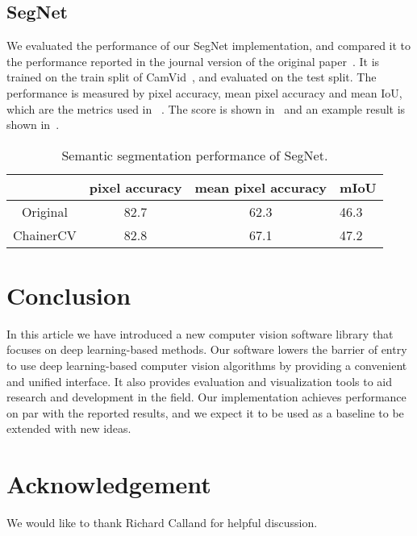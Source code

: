 \documentclass[sigconf]{acmart}
\begin{document}
\subsection{SegNet}
We evaluated the performance of our SegNet implementation, and compared it to the performance reported in the journal version of the original paper~\cite{badrinarayanan2015segnet}. It is trained on the train split of CamVid~\cite{badrinarayanan2015segnet}, and evaluated on the test split.
The performance is measured by pixel accuracy, mean pixel accuracy and mean IoU, which are the metrics used in ~\cite{badrinarayanan2015segnet}.
The score is shown in~ and an example result is shown in~.
\begin{table}[t]
\caption{Semantic segmentation performance of SegNet.}
  \label{table:semantic}
  \begin{tabular}{cccl}
    \toprule
    & pixel accuracy &mean pixel accuracy& mIoU \\
    \midrule
    Original \cite{badrinarayanan2015segnet} & 82.7 & 62.3 & 46.3 \\
    ChainerCV & 82.8 & 67.1 & 47.2 \\
  \bottomrule
\end{tabular}
\end{table}

\section{Conclusion}
In this article we have introduced a new computer vision software library that focuses on deep learning-based methods.
Our software lowers the barrier of entry to use deep learning-based computer vision algorithms by providing a convenient and unified interface.
It also provides evaluation and visualization tools to aid research and development in the field.
Our implementation achieves performance on par with the reported results, and we expect it to be used as a baseline to be extended with new ideas.

\section*{Acknowledgement}
We would like to thank Richard Calland for helpful discussion.
 

 
\end{document}
